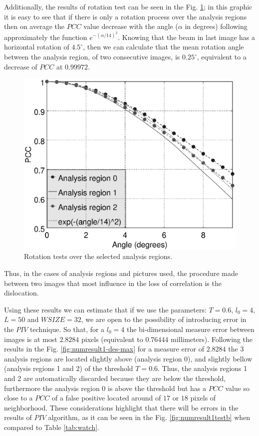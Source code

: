 Additionally, the results of rotation test can be seen in the Fig. \ref{fig:numresult1-rot};
in this graphic it is easy to see that if there is only a rotation process over the 
analysis regions then on average the $PCC$ value decrease with the angle ($\alpha$ in degrees) 
following approximately the function $e^{-\left( \alpha/14\right)^2}$. Knowing that
the beam in last image has a horizontal rotation of $4.5^\circ$, then we can calculate that 
the mean rotation angle between the analysis region, of two consecutive images, 
is $0.25^\circ$, equivalent to a decrease of $PCC$ at $0.99972$.
\begin{figure}[H]
\centering
\includegraphics[width=\columnwidth]{numresult1-maketestjoint-rot.eps}
\caption{Rotation tests over the selected analysis regions.}
\label{fig:numresult1-rot}
\end{figure}
Thus, in the cases of analysis regions and pictures used, 
the procedure made between two images that most influence 
in the loss of correlation is the dislocation.


Using these results we can estimate that if we use the parameters:
$T=0.6$, $l_0=4$, $L=50$ and $WSIZE=32$, we are open to the possibility of introducing
error in the $PIV$ technique.
So that, for a $l_0=4$ the bi-dimensional measure error between images is at most $2.8284$ pixels 
(equivalent to $0.76444$ millimeters). Following the results in the 
Fig. \ref{fig:numresult1-des-max} for a measure error of $2.8284$ the $3$
analysis regions are located 
slightly above (analysis region 0), and 
slightly bellow (analysis regions 1 and 2) of the threshold $T=0.6$.
Thus, the analysis regions 1 and 2 are automatically discarded because they are below the threshold, 
furthermore the analysis region 0 is above the  threshold but has a $PCC$
value so close to a $PCC$ of a false positive located around of $17$ or $18$ pixels of neighborhood.
These considerations highlight that there will be errors in the results of $PIV$ 
algorithm, as it can be seen in the Fig. \ref{fig:numresult1testb} when compared to Table \ref{tab:watch}.

